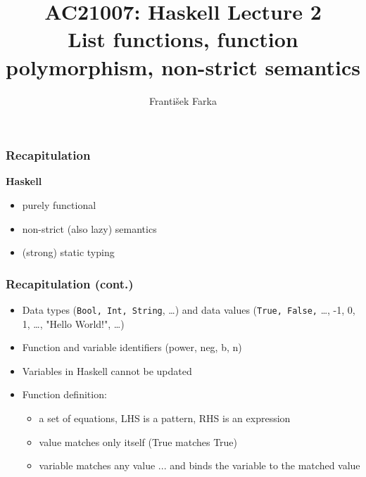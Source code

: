 \documentclass[final,handout]{beamer}
\title[Haskell Lecture 2: List functions, function polymorphism]{AC21007: Haskell Lecture 2\\
List functions, function polymorphism, non-strict semantics}
\author[Franti\v{s}ek Farka]{Franti\v{s}ek Farka}
\date{}
\newcommand\BackgroundPicture[1]{%
  \setbeamertemplate{background}{%
   \parbox[c][\paperheight]{\paperwidth}{%
      \vfill \hfill
\texttt{[image: \#1]}
        \hfill \vfill
     }}}
\begin{document}
\BackgroundPicture{fondo1.png}
\begin{frame}
\titlepage
\end{frame}

\begin{frame}
    \frametitle{Recapitulation}

    {\bf Haskell} 

    \begin{itemize}
    \item purely functional
    
    \item non-strict (also lazy) semantics

    \item (strong) static typing
    
    \end{itemize}

\end{frame}

\begin{frame}[fragile]
    \frametitle{Recapitulation (cont.)}

    \begin{itemize}
        \item 
            Data types (\texttt{Bool, Int, String}, \dots) and
            data values (\texttt{True, False,} \dots, -1, 0, 1, \dots, "Hello
            World!", \dots ) \\
        \item Function and variable identifiers (power, neg, b, n) \\
        \item<3-> Variables in Haskell cannot be updated
        \item<4-> Function definition:
            \begin{itemize}
                \item a set of equations, LHS is a pattern, RHS is an expression
                \item value matches only itself (True matches True)
                \item variable matches any value ... and binds the variable to
                    the matched value
            \end{itemize}
  \end{itemize}

\end{frame}  
\end{document}
